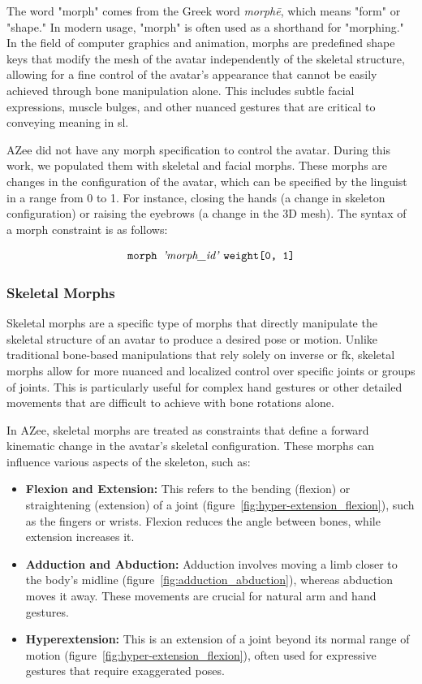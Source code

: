 \documentclass[../../main.tex]{subfiles}
\begin{document}
The word "morph" comes from the Greek word \textit{morphē}, which means "form" or "shape." In modern usage, "morph" is often used as a shorthand for "morphing." In the field of computer graphics and animation, morphs are predefined shape keys that modify the mesh of the avatar independently of the skeletal structure, allowing for a fine control of the avatar's appearance that cannot be easily achieved through bone manipulation alone. This includes subtle facial expressions, muscle bulges, and other nuanced gestures that are critical to conveying meaning in \gls{sl}.

AZee did not have any morph specification to control the avatar. During this work, we populated them with skeletal and facial morphs. These morphs are changes in the configuration of the avatar, which can be specified by the linguist in a range from 0 to 1. For instance, closing the hands (a change in skeleton configuration) or raising the eyebrows (a change in the 3D mesh). The syntax of a morph constraint is as follows:

\[
\texttt{morph } \text{\emph{'morph\_id'}} \ \texttt{weight[0, 1]}
\]

\subsubsection{Skeletal Morphs}
\label{ch:avatar_creation_pose_synthesis:proc_rig_signing_avatars:morph_constraints:skel_morphs}

Skeletal morphs are a specific type of morphs that directly manipulate the skeletal structure of an avatar to produce a desired pose or motion. Unlike traditional bone-based manipulations that rely solely on inverse or \gls{fk}, skeletal morphs allow for more nuanced and localized control over specific joints or groups of joints. This is particularly useful for complex hand gestures or other detailed movements that are difficult to achieve with bone rotations alone.

In AZee, skeletal morphs are treated as constraints that define a forward kinematic change in the avatar's skeletal configuration. These morphs can influence various aspects of the skeleton, such as:

\begin{itemize}
    \item \textbf{Flexion and Extension:} This refers to the bending (flexion) or straightening (extension) of a joint (figure~\ref{fig:hyper-extension_flexion}), such as the fingers or wrists. Flexion reduces the angle between bones, while extension increases it.
    \item \textbf{Adduction and Abduction:} Adduction involves moving a limb closer to the body's midline (figure~\ref{fig:adduction_abduction}), whereas abduction moves it away. These movements are crucial for natural arm and hand gestures.
    \item \textbf{Hyperextension:} This is an extension of a joint beyond its normal range of motion (figure~\ref{fig:hyper-extension_flexion}), often used for expressive gestures that require exaggerated poses.
\end{itemize}
\end{document}
